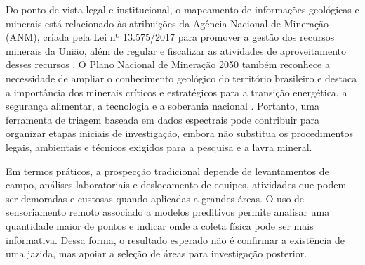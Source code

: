 Do ponto de vista legal e institucional, o mapeamento de informações geológicas e minerais está relacionado às atribuições da Agência Nacional de Mineração (ANM), criada pela Lei nº 13.575/2017 para promover a gestão dos recursos minerais da União, além de regular e fiscalizar as atividades de aproveitamento desses recursos \cite{brasil2017}. O Plano Nacional de Mineração 2050 também reconhece a necessidade de ampliar o conhecimento geológico do território brasileiro e destaca a importância dos minerais críticos e estratégicos para a transição energética, a segurança alimentar, a tecnologia e a soberania nacional \cite{pnm2050}. Portanto, uma ferramenta de triagem baseada em dados espectrais pode contribuir para organizar etapas iniciais de investigação, embora não substitua os procedimentos legais, ambientais e técnicos exigidos para a pesquisa e a lavra mineral.

Em termos práticos, a prospecção tradicional depende de levantamentos de campo, análises laboratoriais e deslocamento de equipes, atividades que podem ser demoradas e custosas quando aplicadas a grandes áreas. O uso de sensoriamento remoto associado a modelos preditivos permite analisar uma quantidade maior de pontos e indicar onde a coleta física pode ser mais informativa. Dessa forma, o resultado esperado não é confirmar a existência de uma jazida, mas apoiar a seleção de áreas para investigação posterior.
